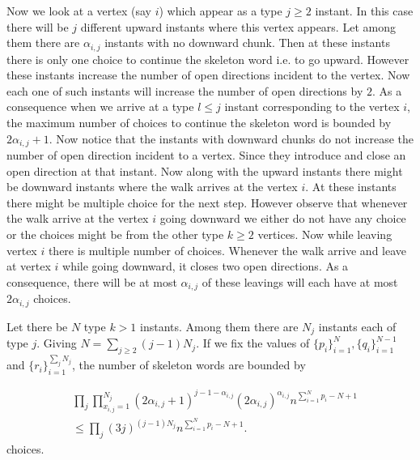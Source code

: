 \documentclass[12pt]{article}
\numberwithin{equation}{section}
\numberwithin{equation}{section}
\theoremstyle{definition}
\renewcommand{\1}{\bf 1}
\begin{document}
 Now we look at a vertex (say $i$) which appear as a type $j\ge 2$ instant. In this case there will be $j$ different upward instants where this vertex appears. Let among them there are $\alpha_{i,j}$ instants with no downward chunk. Then at these instants there is only one choice to continue the skeleton word i.e. to go upward. However these instants increase the number of open directions incident to the vertex. %
 Now each one of such instants will increase the number of open directions by $2$. As a consequence when we arrive at a type $l\le j$ instant corresponding to the vertex $i$, the maximum number of choices to continue the skeleton word is bounded by $2\alpha_{i,j}+1$. Now notice that the instants with downward chunks do not increase the number of open direction incident to a vertex. Since they introduce and close an open direction at that instant. Now along with the upward instants there might be downward instants where the walk arrives at the vertex $i$. At these instants there might be multiple choice for the next step. However observe that whenever the walk arrive at the vertex $i$ going downward we either do not have any choice or the choices might be from the other type $k\ge 2$ vertices. Now while leaving vertex $i$ there is multiple number of choices. Whenever the walk arrive and leave at vertex $i$ while going downward, it closes two open directions. As a consequence, there will be at most $\alpha_{i,j}$ of these leavings will each have at most $2\alpha_{i,j}$ choices. 

Let there be $N$ type $k>1$ instants. Among them there are $N_{j}$ instants each of type $j$. Giving $N =\sum_{j\ge 2}(j-1)N_{j}$. If we fix the values of $\{ p_{i} \}_{i=1}^{N}, \{ q_{i} \}_{i=1}^{N-1}$ and $\{r_{i}\}_{i=1}^{\sum_{j}N_{j}}$, the number of skeleton words are bounded by  

\begin{equation}\label{countskeleton}
\begin{split}
 &\prod_{j} \prod_{x_{i,j}=1}^{N_{j}}(2\alpha_{i,j}+1)^{j-1-\alpha_{i,j}}(2\alpha_{i,j})^{\alpha_{i,j}} n^{\sum_{i=1}^{N}p_{i}-N +1}\\
 & \le \prod_{j} (3j)^{(j-1)N_{j}} n^{\sum_{i=1}^{N}p_{i}-N +1}.
 \end{split}
\end{equation}  
choices. 
\end{document}
